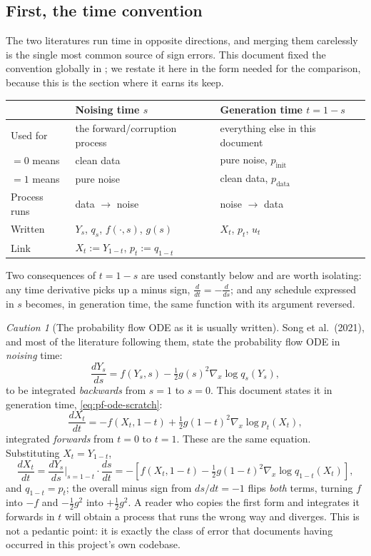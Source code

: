 \documentclass[11pt,a4paper]{report}
\theoremstyle{definition}
\theoremstyle{remark}
\newtheorem{caution}[caution]{Caution}
\begin{document}
\subsection{First, the time convention}
\label{sec:notation-bridge}

The two literatures run time in opposite directions, and merging them
carelessly is the single most common source of sign errors. This document
fixed the convention globally in ; we
restate it here in the form needed for the comparison, because this is the
section where it earns its keep.

\begin{center}
\begin{tabular}{p{3.2cm}p{5.0cm}p{5.0cm}}
\toprule
& \textbf{Noising time $s$} & \textbf{Generation time $t=1-s$} \\
\midrule
Used for & the forward/corruption process & everything else in this document \\
$=0$ means & clean data & pure noise, $p_{\mathrm{init}}$ \\
$=1$ means & pure noise & clean data, $p_{\mathrm{data}}$ \\
Process runs & data $\to$ noise & noise $\to$ data \\
Written & $Y_s$, $q_s$, $f(\cdot,s)$, $g(s)$ & $X_t$, $p_t$, $u_t$ \\
Link & \multicolumn{2}{l}{$X_t := Y_{1-t}$, \quad $p_t := q_{1-t}$} \\
\bottomrule
\end{tabular}
\end{center}

Two consequences of $t=1-s$ are used constantly below and are worth
isolating: any time derivative picks up a minus sign,
$\frac{d}{dt} = -\frac{d}{ds}$; and any schedule expressed in $s$ becomes,
in generation time, the same function with its argument reversed.

\begin{caution}[The probability flow ODE as it is usually written]
\label{caution:pfode-sign}
Song et al.\ (2021), and most of the literature following them, state the
probability flow ODE in \emph{noising} time:
\[
\frac{dY_s}{ds} = f(Y_s,s) - \tfrac12g(s)^2\nabla_x\log q_s(Y_s) ,
\]
to be integrated \emph{backwards} from $s=1$ to $s=0$. This document states
it in generation time, \eqref{eq:pf-ode-scratch}:
\[
\frac{dX_t}{dt} = -f(X_t,1-t) + \tfrac12g(1-t)^2\nabla_x\log p_t(X_t) ,
\]
integrated \emph{forwards} from $t=0$ to $t=1$. These are the same
equation. Substituting $X_t=Y_{1-t}$,
\[
\frac{dX_t}{dt} = \frac{dY_s}{ds}\Big|_{s=1-t}\cdot\frac{ds}{dt}
= -\left[f(X_t,1-t)-\tfrac12g(1-t)^2\nabla_x\log q_{1-t}(X_t)\right] ,
\]
and $q_{1-t}=p_t$; the overall minus sign from $ds/dt=-1$ flips \emph{both}
terms, turning $f$ into $-f$ and $-\tfrac12g^2$ into $+\tfrac12g^2$. A
reader who copies the first form and integrates it forwards in $t$ will
obtain a process that runs the wrong way and diverges. This is not a
pedantic point: it is exactly the class of error that
 documents having occurred in this
project's own codebase.
\end{caution}
\end{document}
